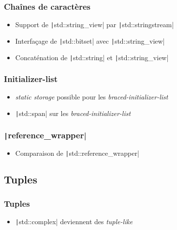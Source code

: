 \documentclass[C++.tex]{subfiles}
\begin{document}
\begin{frame}[fragile]
	\frametitle{Chaînes de caractères}
	\begin{itemize}
		\item Support de \texttt|std::string_view| par \texttt|std::stringstream|
		\item Interfaçage de \texttt|std::bitset| avec \texttt|std::string_view|
		\item Concaténation de \texttt|std::string| et \texttt|std::string_view|
	\end{itemize}

\end{frame}

\begin{frame}[fragile]
	\frametitle{Initializer-list}
	\begin{itemize}
		\item \textit{static storage} possible pour les \textit{braced-initializer-list}


		\item \texttt|std::span| sur les \textit{braced-initializer-list}
	\end{itemize}

\end{frame}

\begin{frame}[fragile]
	\frametitle{\texttt|reference_wrapper|}
	\begin{itemize}
		\item Comparaison de \texttt|std::reference_wrapper|
	\end{itemize}

\end{frame}

\subsection*{Tuples}
\begin{frame}[fragile]
	\frametitle{Tuples}
	\begin{itemize}
		\item \texttt|std::complex| deviennent des \textit{tuple-like}
	\end{itemize}

\end{frame}
\end{document}
